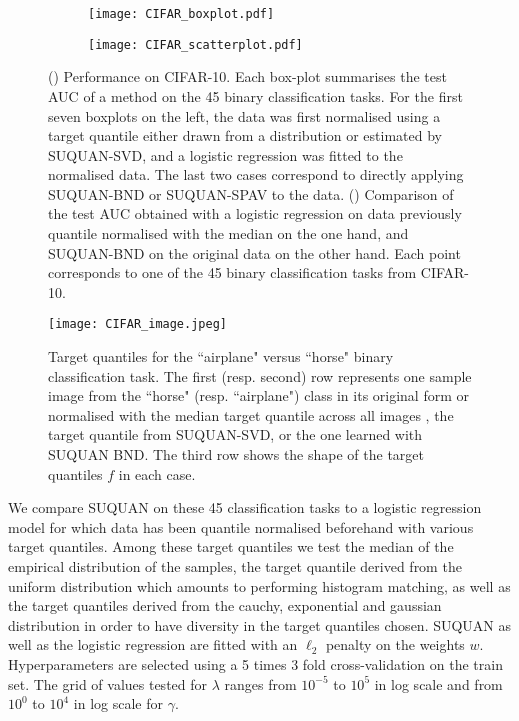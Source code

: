\documentclass{article}
\begin{document}
\begin{figure}[!ht]
\centering
\begin{subfigure}[t]{0.48\linewidth}
	\centering
	\caption{}\label{CIFAR_boxplot}
	\vspace{-1em}
	\texttt{[image: CIFAR\_boxplot.pdf]}	
\end{subfigure}
\quad
\begin{subfigure}[t]{0.48\linewidth}
	\centering
	\caption{}\label{CIFAR_scatterplot}
	\vspace{-1em}
	\texttt{[image: CIFAR\_scatterplot.pdf]}
\end{subfigure}
\caption{ () Performance on CIFAR-10. Each box-plot summarises the test AUC of a method on the 45 binary classification tasks. For the first seven boxplots on the left, the data was first normalised using a target quantile either drawn from a distribution or estimated by SUQUAN-SVD, and a logistic regression was fitted to the normalised data. The last two cases correspond to directly applying SUQUAN-BND or SUQUAN-SPAV to the data. () Comparison of the test AUC obtained with a logistic regression on data previously quantile normalised with the median on the one hand, and SUQUAN-BND on the original data on the other hand. Each point corresponds to one of the 45 binary classification tasks from CIFAR-10.}
\label{CIFAR_boxplot_scatterplot}
\end{figure}

\begin{figure}[]
\center
\texttt{[image: CIFAR\_image.jpeg]}
\caption{Target quantiles for the ``airplane" versus ``horse" binary classification task. The first (resp. second) row represents one sample image from the ``horse" (resp. ``airplane") class in its original form or normalised with the median target quantile across all images , the target quantile from SUQUAN-SVD, or the one learned with SUQUAN BND. The third row shows the shape of the target quantiles $f$ in each case.}
\label{CIFAR_image}
\end{figure}

We compare SUQUAN on these 45 classification tasks to a logistic regression model for which data has been quantile normalised beforehand with various target quantiles. Among these target quantiles we test the median of the empirical distribution of the samples, the target quantile derived from the uniform distribution which amounts to performing histogram matching, as well as the target quantiles derived from the cauchy, exponential and gaussian distribution in order to have diversity in the target quantiles chosen. SUQUAN as well as the logistic regression are fitted with an $\ell_2$ penalty on the weights $w$. Hyperparameters are selected using a 5 times 3 fold cross-validation on the train set. The grid of values tested for $\lambda$ ranges from $10^{-5}$ to $10^5$ in log scale and from  $10^{0}$ to $10^4$ in log scale for $\gamma$.
\end{document}
